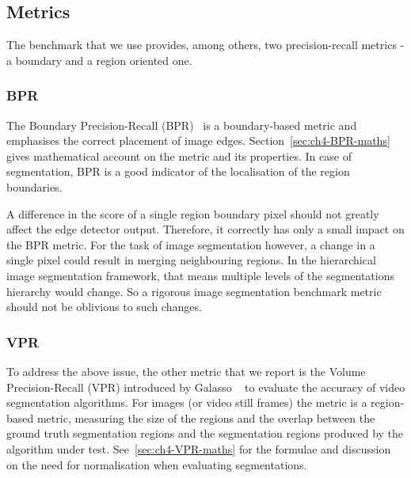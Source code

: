 \subsection{Metrics}
The benchmark that we use provides, among others, two precision-recall metrics - a boundary and a region oriented one.

\subsubsection*{BPR}
The Boundary Precision-Recall (BPR)~\cite{Arbelaez11} is a boundary-based metric and emphasises the correct placement of image edges. Section~\ref{sec:ch4-BPR-maths} gives mathematical account on the metric and its properties. In case of segmentation, BPR is a good indicator of the localisation of the region boundaries.

A difference in the score of a single region boundary pixel should not greatly affect the edge detector output. Therefore, it correctly has only a small impact on the BPR metric. For the task of image segmentation however, a change in a single pixel could result in merging neighbouring regions. In the hierarchical image segmentation framework, that means multiple levels of the segmentations hierarchy would change. So a rigorous image segmentation benchmark metric should not be oblivious to such changes.

\subsubsection*{VPR}
To address the above issue, the other metric that we report is the Volume Precision-Recall (VPR) introduced by Galasso \etal~\cite{Galasso13} to evaluate the accuracy of video segmentation algorithms. For images (or video still frames) the metric is a region-based metric, measuring the size of the regions and the overlap between the ground truth segmentation regions and the segmentation regions produced by the algorithm under test. 
See~\ref{sec:ch4-VPR-maths} for the formulae and discussion on the need for normalisation when evaluating segmentations.

